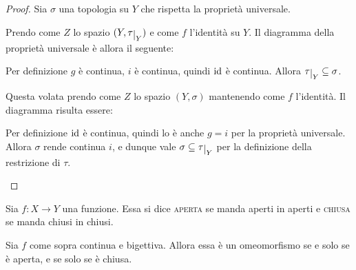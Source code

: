 \documentclass{article}
\begin{document}
\begin{proof}
    Sia $\sigma$ una topologia su $Y$ che rispetta la propriet\`a universale.
    \begin{nlist}
        \item Prendo come $Z$ lo spazio $(Y, \tau\restrict{Y})$ e come $f$
        l'identità su $Y$. Il diagramma della proprietà universale \`e allora il
        seguente:

        \begin{center}\end{center}

        Per definizione $g$ \`e continua, $i$ \`e continua, quindi $\operatorname{id}$ \`e
        continua. Allora $\tau\restrict{Y} \subseteq \sigma$.

        \item Questa volata prendo come $Z$ lo spazio $(Y, \sigma)$ mantenendo
        come $f$ l'identità. Il diagramma risulta essere:

        \begin{center}\end{center}

        Per definizione $\operatorname{id}$ \`e continua, quindi lo \`e anche $g=i$ per la
        propriet\`a universale. Allora $\sigma$ rende continua $i$, e dunque
        vale $\sigma \subseteq \tau\restrict{Y}$ per la definizione della
        restrizione di $\tau$.
    \end{nlist}
\end{proof}

\begin{defn}
    Sia $f:X\longrightarrow Y$ una funzione. Essa si dice \textsc{aperta} se manda aperti in aperti e \textsc{chiusa} se manda chiusi in chiusi.
\end{defn}

\begin{oss}
    Sia $f$ come sopra continua e bigettiva. Allora essa \`e un omeomorfismo se e solo se \`e aperta, e se solo se \`e chiusa.
\end{oss}
\end{document}
